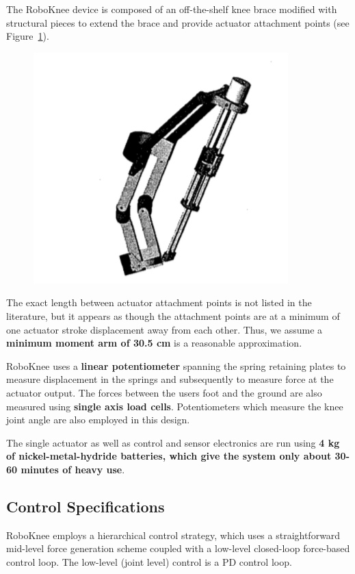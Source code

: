  The RoboKnee device is composed of an off-the-shelf knee brace modified with structural pieces to extend the brace and provide actuator attachment points (see Figure~\ref{fig:roboKnee}).
 \begin{figure}[thpb]
\centering
\includegraphics[width=3.in]{exos/figs/roboKnee/roboBrace}
  \caption{}
  \vspace{-0.2in}
 \label{fig:roboKnee}   
 \end{figure}
 The exact length between actuator attachment points is not listed in the literature, but it appears as though the attachment points are at a minimum of one actuator stroke displacement away from each other. Thus, we assume a {\bf minimum moment arm of 30.5 cm} is a reasonable approximation.
 
 RoboKnee uses a \textbf{linear potentiometer} spanning the spring retaining plates to measure displacement in the springs and subsequently to measure force at the actuator output.  The forces between the users foot and the ground are also measured using \textbf{single axis load cells}.  Potentiometers which measure the knee joint angle are also employed in this design.     
 
 The single actuator as well as control and sensor electronics are run using {\bf 4 kg of nickel-metal-hydride batteries, which give the system only about 30-60 minutes of heavy use}.
 
 
 \subsection{Control Specifications}
 
 RoboKnee employs a hierarchical control strategy, which uses a straightforward mid-level force generation scheme coupled with a low-level closed-loop force-based control loop.  The low-level (joint level) control is a PD control loop.
 
